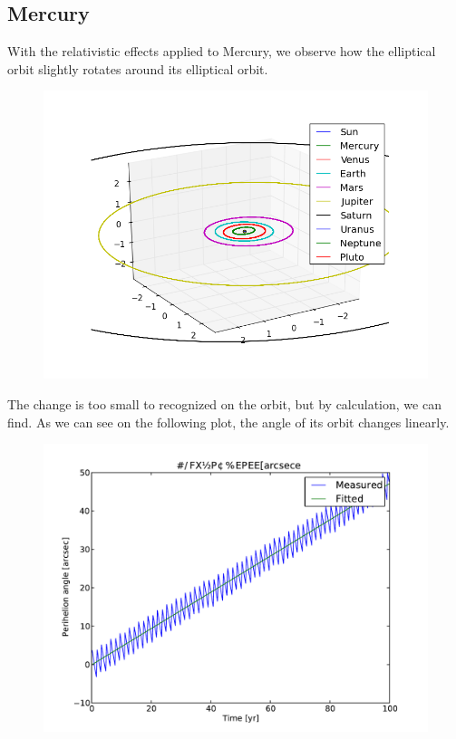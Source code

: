 \documentclass[10pt]{article}
\begin{document}
\begin{multicols}{2}
\subsection{Mercury}
With the relativistic effects applied to Mercury, we observe how the elliptical orbit slightly rotates around its elliptical orbit. 
\begin{figure}[H]
    \centering
    \includegraphics[width=1.0\linewidth]{../results/full_system_inner.png}
    \label{fig:name}
\end{figure}
The change is too small to recognized on the orbit, but by calculation, we can find. As we can see on the following plot, the angle of its orbit changes linearly.
\begin{figure}[H]
    \centering
    \includegraphics[width=1.0\linewidth]{../results/peri_precession}
    \label{fig:name}
\end{figure}



\end{multicols}
\end{document}
